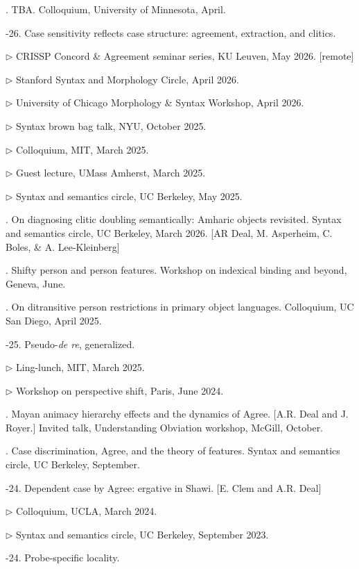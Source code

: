 \documentclass[12pt]{article}
\begin{document}
. TBA. Colloquium, University of Minnesota, April.


-26. Case sensitivity reflects case structure: agreement, extraction, and clitics. 

\indd $\rhd$ CRISSP Concord \& Agreement seminar series, KU Leuven, May 2026. [remote]

\indd $\rhd$ Stanford Syntax and Morphology Circle, April 2026.

\indd $\rhd$ University of Chicago Morphology \& Syntax Workshop, April 2026. 


\indd $\rhd$ Syntax brown bag talk, NYU, October 2025. 

\indd $\rhd$ Colloquium, MIT, March 2025.

\indd $\rhd$ Guest lecture, UMass Amherst, March 2025.

\indd $\rhd$ Syntax and semantics circle, UC Berkeley, May 2025.

. On diagnosing clitic doubling semantically: Amharic objects revisited.  Syntax and semantics circle, UC Berkeley, March 2026. [AR Deal, M. Asperheim, C. Boles, \& A. Lee-Kleinberg] 

. Shifty person and person features. Workshop on indexical binding and beyond, Geneva, June.


. On ditransitive person restrictions in primary object languages. Colloquium, UC San Diego, April 2025.




-25. Pseudo-\emph{de re}, generalized. 

\indd $\rhd$ Ling-lunch, MIT, March 2025.

\indd $\rhd$ Workshop on perspective shift, Paris, June 2024.


. Mayan animacy hierarchy effects and the dynamics of Agree. [A.R. Deal and J. Royer.] Invited talk, Understanding Obviation workshop, McGill, October.

. Case discrimination, Agree, and the theory of features. Syntax and semantics circle, UC Berkeley, September.



-24. Dependent case by Agree: ergative in Shawi.   [E. Clem and A.R. Deal]

\indd $\rhd$ Colloquium, UCLA, March 2024.

\indd $\rhd$  Syntax and semantics circle, UC Berkeley, September 2023.

-24. Probe-specific locality. 
\end{document}
